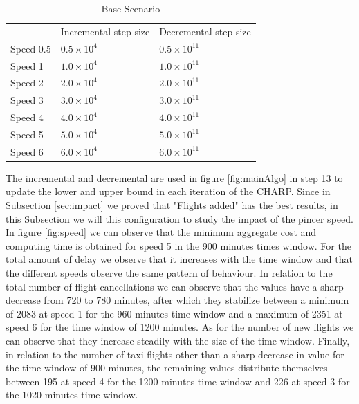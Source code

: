 	\begin{table}[h!]
		\centering
		\caption{Base Scenario}
		\label{tbl:pincerSpeed}
		\begin{tabular}{lll}
			\hline
			& Incremental step size     & Decremental step size      \\
			Speed 0.5 & $0.5 \times 10^{4}$ & $0.5 \times 10^{11}$ \\
			Speed 1   & $1.0 \times 10^{4}$ & $1.0 \times 10^{11}$ \\
			Speed 2   & $2.0 \times 10^{4}$ & $2.0 \times 10^{11}$ \\
			Speed 3   & $3.0 \times 10^{4}$ & $3.0 \times 10^{11}$ \\
			Speed 4   & $4.0 \times 10^{4}$ & $4.0 \times 10^{11}$ \\
			Speed 5   & $5.0 \times 10^{4}$ & $5.0 \times 10^{11}$ \\
			Speed 6   & $6.0 \times 10^{4}$ & $6.0 \times 10^{11}$ \\
			\hline
		\end{tabular}
	\end{table} 
The incremental and decremental are used in figure \ref{fig:mainAlgo} in step  13 to update the lower and upper bound in each iteration of the CHARP.
Since in Subsection \ref{sec:impact} we proved that "Flights added" has the best results, in this Subsection we will this configuration to study the impact of the pincer speed.\\

 In figure \ref{fig:speed} we can observe that the minimum aggregate cost and computing time is obtained for speed 5 in the 900 minutes times window. For the total amount of delay we observe that it increases with the time window and that the different speeds observe the same pattern of behaviour. In relation to the total number of flight cancellations we can observe that the values have a sharp decrease from 720 to 780 minutes, after which they stabilize between a minimum of 2083 at speed 1 for the 960 minutes time window  and a maximum of 2351 at speed 6 for the time window of 1200 minutes. As for the number of new flights we can observe that they increase steadily with the size of the time window. Finally, in relation to the number of taxi flights other than a sharp decrease in value for the time window of 900 minutes, the remaining values distribute themselves between 195 at speed 4 for the 1200 minutes time window and 226 at speed 3 for the 1020 minutes time window.
 

